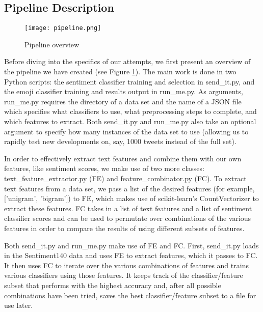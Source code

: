 \documentclass[10pt]{article}
\begin{document}
\subsection{Pipeline Description}
\begin{figure}
    \centering
    \texttt{[image: pipeline.png]}
    \caption{Pipeline overview}
    \label{fig:pipeline}
\end{figure}
Before diving into the specifics of our attempts, we first present an overview of the pipeline we have created (see Figure \ref{fig:pipeline}). The main work is done in two Python scripts: the sentiment classifier training and selection in send\_it.py, and the emoji classifier training and results output in run\_me.py. As arguments, run\_me.py requires the directory of a data set and the name of a JSON file which specifies what classifiers to use, what preprocessing steps to complete, and which features to extract. Both send\_it.py and run\_me.py also take an optional argument to specify how many instances of the data set to use (allowing us to rapidly test new developments on, say, 1000 tweets instead of the full set).

In order to effectively extract text features and combine them with our own features, like sentiment scores, we make use of two more classes: text\_feature\_extractor.py (FE) and feature\_combinator.py (FC). To extract text features from a data set, we pass a list of the desired features (for example, ['unigram', 'bigram']) to FE, which makes use of scikit-learn's CountVectorizer to extract these features. FC takes in a list of text features and a list of sentiment classifier scores and can be used to permutate %
over combinations of the various features in order to compare the results of using different subsets of features.

Both send\_it.py and run\_me.py make use of FE and FC. First, send\_it.py loads in the Sentiment140 data and uses FE to extract features, which it passes to FC. It then uses FC to iterate over the various combinations of features and trains various classifiers using those features. It keeps track of the classifier/feature subset that performs with the highest accuracy and, after all possible combinations have been tried, saves the best classifier/feature subset to a file for use later.
\end{document}
